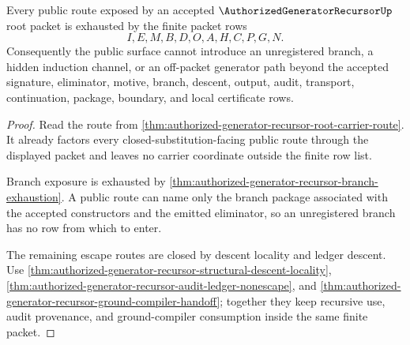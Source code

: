 \begin{theorem}
\label{thm:authorized-generator-recursor-finite-route-exposure}
Every public route exposed by an accepted $\AuthorizedGeneratorRecursorUp$ root packet is exhausted by the finite packet rows
$$
I,E,M,B,D,O,A,H,C,P,G,N.
$$
Consequently the public surface cannot introduce an unregistered branch, a hidden induction channel, or an off-packet generator path beyond the accepted signature, eliminator, motive, branch, descent, output, audit, transport, continuation, package, boundary, and local certificate rows.
\end{theorem}
\begin{proof}
Read the route from \autoref{thm:authorized-generator-recursor-root-carrier-route}. It already factors every closed-substitution-facing public route through the displayed packet and leaves no carrier coordinate outside the finite row list.

Branch exposure is exhausted by \autoref{thm:authorized-generator-recursor-branch-exhaustion}. A public route can name only the branch package associated with the accepted constructors and the emitted eliminator, so an unregistered branch has no row from which to enter.

The remaining escape routes are closed by descent locality and ledger descent. Use \autoref{thm:authorized-generator-recursor-structural-descent-locality}, \autoref{thm:authorized-generator-recursor-audit-ledger-nonescape}, and \autoref{thm:authorized-generator-recursor-ground-compiler-handoff}; together they keep recursive use, audit provenance, and ground-compiler consumption inside the same finite packet.
\end{proof}

